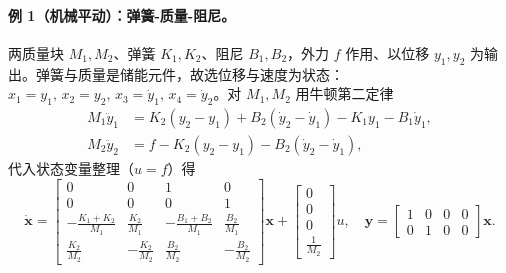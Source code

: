 \paragraph{例 1（机械平动）：弹簧-质量-阻尼。}
两质量块 $M_1,M_2$、弹簧 $K_1,K_2$、阻尼 $B_1,B_2$，外力 $f$ 作用、以位移 $y_1,y_2$ 为输出。弹簧与质量是储能元件，故选位移与速度为状态：$x_1=y_1,\,x_2=y_2,\,x_3=\dot y_1,\,x_4=\dot y_2$。对 $M_1,M_2$ 用牛顿第二定律
\begin{align}
  M_1\ddot y_1 &= K_2(y_2-y_1)+B_2(\dot y_2-\dot y_1)-K_1 y_1-B_1\dot y_1, \\
  M_2\ddot y_2 &= f-K_2(y_2-y_1)-B_2(\dot y_2-\dot y_1),
  \label{eq:ssb-mech-newton}
\end{align}
代入状态变量整理（$u=f$）得
\begin{equation}
  \dot{\mathbf{x}}=
  \begin{bmatrix}
    0&0&1&0\\ 0&0&0&1\\
    -\tfrac{K_1+K_2}{M_1}&\tfrac{K_2}{M_1}&-\tfrac{B_1+B_2}{M_1}&\tfrac{B_2}{M_1}\\[2pt]
    \tfrac{K_2}{M_2}&-\tfrac{K_2}{M_2}&\tfrac{B_2}{M_2}&-\tfrac{B_2}{M_2}
  \end{bmatrix}\mathbf{x}
  +\begin{bmatrix}0\\0\\0\\\tfrac{1}{M_2}\end{bmatrix}u,
  \quad
  \mathbf{y}=\begin{bmatrix}1&0&0&0\\0&1&0&0\end{bmatrix}\mathbf{x}.
  \label{eq:ssb-mech-ss}
\end{equation}

